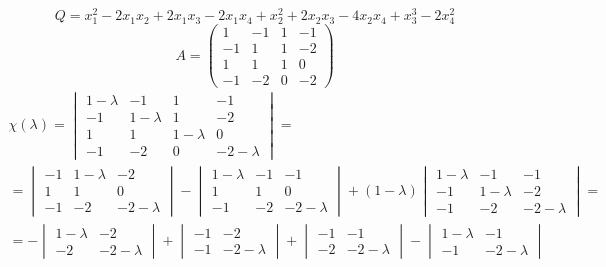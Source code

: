 $$ Q = x_1^2 - 2x_1x_2 + 2x_1x_3 - 2x_1x_4 + x_2^2 + 2x_2x_3 - 4x_2x_4 + x_3^3 - 2x_4^2 $$
$$ A =
\begin{pmatrix}
	1 & -1 & 1 & -1 \\
    -1 & 1 & 1 & -2 \\
    1 & 1 & 1 & 0 \\
    -1 & -2 & 0 & -2
\end{pmatrix} $$
\begin{multline*}
    \chi(\lambda) =
    \begin{vmatrix}
        1 - \lambda & -1 & 1 & -1 \\
        -1 & 1 - \lambda & 1 & -2 \\
        1 & 1 & 1 - \lambda & 0 \\
        -1 & -2 & 0 & -2 - \lambda
    \end{vmatrix} = \\
    =
    \begin{vmatrix}
        -1 & 1 - \lambda & -2 \\
        1 & 1 & 0 \\
        -1 & -2 & -2 - \lambda
    \end{vmatrix} -
    \begin{vmatrix}
        1 - \lambda & -1 & -1 \\
        1 & 1 & 0 \\
        -1 & -2 & -2 - \lambda
    \end{vmatrix} + (1 - \lambda)
    \begin{vmatrix}
        1 - \lambda & -1 & -1 \\
        -1 & 1 - \lambda & -2 \\
        -1 & -2 & -2 - \lambda
    \end{vmatrix} = \\
    = -
    \begin{vmatrix}
    	1 - \lambda & -2 \\
        -2 & -2 - \lambda
    \end{vmatrix} +
    \begin{vmatrix}
    	-1 & -2 \\
        -1 & -2 - \lambda
    \end{vmatrix} +
    \begin{vmatrix}
    	-1 & -1 \\
        -2 & -2 - \lambda
    \end{vmatrix} -
    \begin{vmatrix}
    	1 - \lambda & -1 \\
        -1 & -2 - \lambda

\end{vmatrix}
\end{multline*}
